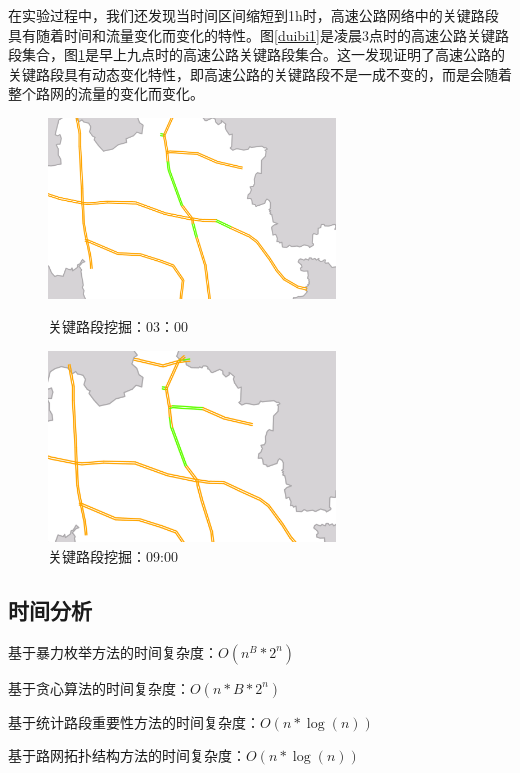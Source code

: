 				在实验过程中，我们还发现当时间区间缩短到1h时，高速公路网络中的关键路段具有随着时间和流量变化而变化的特性。图\ref{duibi1}是凌晨3点时的高速公路关键路段集合，图\ref{duibi2}是早上九点时的高速公路关键路段集合。这一发现证明了高速公路的关键路段具有动态变化特性，即高速公路的关键路段不是一成不变的，而是会随着整个路网的流量的变化而变化。


				\begin{figure}[h]
				\begin{minipage}{0.5\linewidth}
					\centering
					\includegraphics[width=3.0in]{picture/duibi1}
					\caption{关键路段挖掘：03：00}
					\label{duibi1}
				\end{minipage}%
				\begin{minipage}{0.5\linewidth}
					\centering
					\includegraphics[width=3.0in]{picture/duibi2}
					\caption{关键路段挖掘：09:00}
					\label{duibi2}
				\end{minipage}
				\end{figure}

			\subsection{时间分析}
				基于暴力枚举方法的时间复杂度：$O({n^B}*{2^n})$

				基于贪心算法的时间复杂度：$O(n*B*{2^n})$

				基于统计路段重要性方法的时间复杂度：$O(n*\log (n))$

				基于路网拓扑结构方法的时间复杂度：$O(n*\log (n))$

